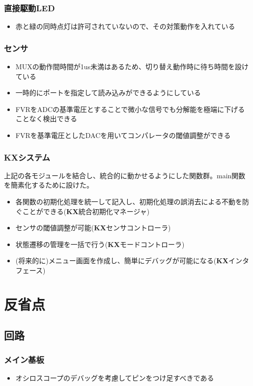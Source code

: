 \documentclass[a4paper]{ltjsarticle}
\newcommand{\kasix}{\textbf{K\hspace{-0.31em}\raisebox{0.17em}{\scalebox{0.7}{A}}\hspace{-0.11em}{S}\hspace{-0.08em}\scalebox{0.8}{i}\hspace{-0.1em}X}}
\begin{document}
\subsubsection{直接駆動LED}
\begin{itemize}
  \item 赤と緑の同時点灯は許可されていない\cite{ds:led}ので、その対策動作を入れている
\end{itemize}
\subsubsection{センサ}
\begin{itemize}
  \item MUXの動作間時間が1us未満はある\cite{ds:mux}ため、切り替え動作時に待ち時間を設けている
  \item 一時的にポートを指定して読み込みができるようにしている
  \item FVRをADCの基準電圧とすることで微小な信号でも分解能を極端に下げることなく検出できる
  \item FVRを基準電圧としたDACを用いてコンパレータの閾値調整ができる
\end{itemize}
\subsubsection{\kasix システム}
上記の各モジュールを結合し、統合的に動かせるようにした関数群。main関数を簡素化するために設けた。
\begin{itemize}
  \item 各関数の初期化処理を統一して記入し、初期化処理の誤消去による不動を防ぐことができる(\kasix 統合初期化マネージャ)
  \item センサの閾値調整が可能(\kasix センサコントローラ)
  \item 状態遷移の管理を一括で行う(\kasix モードコントローラ)
  \item (将来的に)メニュー画面を作成し、簡単にデバッグが可能になる(\kasix インタフェース)
\end{itemize}



\section{反省点}
\subsection{回路}
\subsubsection{メイン基板}
\begin{itemize}
  \item オシロスコープのデバッグを考慮してピンをつけ足すべきである
\end{itemize}
\end{document}
